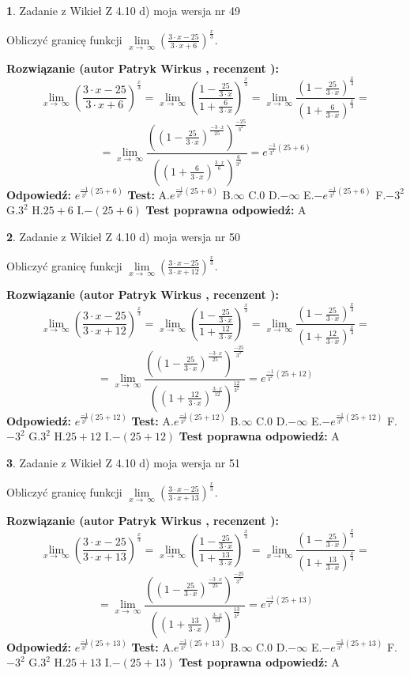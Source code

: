 \documentclass[12pt, a4paper]{article}
\theoremstyle{definition} %
\newtheorem{zad}{}
\newcommand{\zadStart}[1]{\begin{zad}#1\newline}
\newcommand{\zadStop}{\end{zad}}
\newcommand{\rozwStart}[2]{\noindent \textbf{Rozwiązanie (autor #1 , recenzent #2): }\newline}
\newcommand{\rozwStop}{\newline}
\newcommand{\odpStart}{\noindent \textbf{Odpowiedź:}\newline}
\newcommand{\odpStop}{\newline}
\newcommand{\testStart}{\noindent \textbf{Test:}\newline}
\newcommand{\testStop}{\newline}
\newcommand{\kluczStart}{\noindent \textbf{Test poprawna odpowiedź:}\newline}
\newcommand{\kluczStop}{\newline}
\begin{document}
\zadStart{Zadanie z Wikieł Z 4.10 d) moja wersja nr 49}


Obliczyć granicę funkcji  $\lim\limits_{x\to\ \infty}(\frac{3\cdot x-25}{3\cdot x+6})^{\frac{x}{3}}$.
\zadStop
\rozwStart{Patryk Wirkus}{}
$$\lim\limits_{x\to\ \infty}(\frac{3\cdot x-25}{3\cdot x+6})^{\frac{x}{3}} = \lim\limits_{x\to\ \infty}(\frac{1-\frac{25}{3\cdot x}}{1+\frac{6}{3\cdot x}})^{\frac{x}{3}}=\lim\limits_{x\to\ \infty}\frac{(1-\frac{25}{3\cdot x})^{\frac{x}{3}}}{(1+\frac{6}{3\cdot x})^{\frac{x}{3}}}=$$
$$=\lim\limits_{x\to\ \infty}\frac{((1-\frac{25}{3\cdot x})^{\frac{-3\cdot x}{25}})^{\frac{-25}{3^{2}}}}{((1+\frac{6}{3\cdot x})^{\frac{3\cdot x}{6}})^{\frac{6}{3^{2}}}}=e^{\frac{-1}{3^{2}}(25+6)}$$
\rozwStop
\odpStart
$e^{\frac{-1}{3^{2}}(25+6)}$
\odpStop
\testStart
A.$e^{\frac{-1}{3^{2}}(25+6)}$ B.$\infty$ C.$0$ D.$-\infty$ E.$-e^{\frac{-1}{3^{2}}(25+6)}$
F.$-3^{2}$ G.$3^{2}$
H.$25+6$
I.$-(25+6)$
\testStop
\kluczStart
A
\kluczStop



\zadStart{Zadanie z Wikieł Z 4.10 d) moja wersja nr 50}


Obliczyć granicę funkcji  $\lim\limits_{x\to\ \infty}(\frac{3\cdot x-25}{3\cdot x+12})^{\frac{x}{3}}$.
\zadStop
\rozwStart{Patryk Wirkus}{}
$$\lim\limits_{x\to\ \infty}(\frac{3\cdot x-25}{3\cdot x+12})^{\frac{x}{3}} = \lim\limits_{x\to\ \infty}(\frac{1-\frac{25}{3\cdot x}}{1+\frac{12}{3\cdot x}})^{\frac{x}{3}}=\lim\limits_{x\to\ \infty}\frac{(1-\frac{25}{3\cdot x})^{\frac{x}{3}}}{(1+\frac{12}{3\cdot x})^{\frac{x}{3}}}=$$
$$=\lim\limits_{x\to\ \infty}\frac{((1-\frac{25}{3\cdot x})^{\frac{-3\cdot x}{25}})^{\frac{-25}{3^{2}}}}{((1+\frac{12}{3\cdot x})^{\frac{3\cdot x}{12}})^{\frac{12}{3^{2}}}}=e^{\frac{-1}{3^{2}}(25+12)}$$
\rozwStop
\odpStart
$e^{\frac{-1}{3^{2}}(25+12)}$
\odpStop
\testStart
A.$e^{\frac{-1}{3^{2}}(25+12)}$ B.$\infty$ C.$0$ D.$-\infty$ E.$-e^{\frac{-1}{3^{2}}(25+12)}$
F.$-3^{2}$ G.$3^{2}$
H.$25+12$
I.$-(25+12)$
\testStop
\kluczStart
A
\kluczStop



\zadStart{Zadanie z Wikieł Z 4.10 d) moja wersja nr 51}


Obliczyć granicę funkcji  $\lim\limits_{x\to\ \infty}(\frac{3\cdot x-25}{3\cdot x+13})^{\frac{x}{3}}$.
\zadStop
\rozwStart{Patryk Wirkus}{}
$$\lim\limits_{x\to\ \infty}(\frac{3\cdot x-25}{3\cdot x+13})^{\frac{x}{3}} = \lim\limits_{x\to\ \infty}(\frac{1-\frac{25}{3\cdot x}}{1+\frac{13}{3\cdot x}})^{\frac{x}{3}}=\lim\limits_{x\to\ \infty}\frac{(1-\frac{25}{3\cdot x})^{\frac{x}{3}}}{(1+\frac{13}{3\cdot x})^{\frac{x}{3}}}=$$
$$=\lim\limits_{x\to\ \infty}\frac{((1-\frac{25}{3\cdot x})^{\frac{-3\cdot x}{25}})^{\frac{-25}{3^{2}}}}{((1+\frac{13}{3\cdot x})^{\frac{3\cdot x}{13}})^{\frac{13}{3^{2}}}}=e^{\frac{-1}{3^{2}}(25+13)}$$
\rozwStop
\odpStart
$e^{\frac{-1}{3^{2}}(25+13)}$
\odpStop
\testStart
A.$e^{\frac{-1}{3^{2}}(25+13)}$ B.$\infty$ C.$0$ D.$-\infty$ E.$-e^{\frac{-1}{3^{2}}(25+13)}$
F.$-3^{2}$ G.$3^{2}$
H.$25+13$
I.$-(25+13)$
\testStop
\kluczStart
A
\kluczStop
\end{document}
